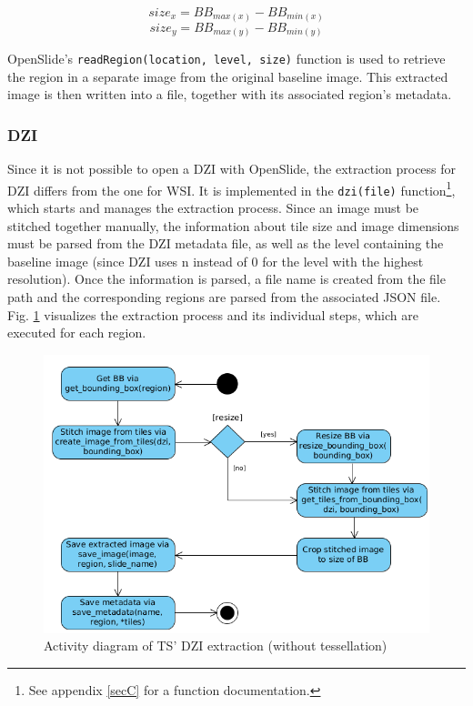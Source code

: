 \begin{equation}\label{eq:sizeX}
size_x = BB_{max(x)} - BB_{min(x)}
\end{equation}
\begin{equation}\label{eq:sizey}
size_y = BB_{max(y)} - BB_{min(y)}
\end{equation}

OpenSlide's \texttt{readRegion(location, level, size)} function is used to retrieve the region in a separate image from the original baseline image. This extracted image is then written into a file, together with its associated region's metadata.

\subsubsection{DZI}
Since it is not possible to open a DZI with OpenSlide, the extraction process for DZI differs from the one for WSI. It is implemented in the \texttt{dzi(file)} function\footnote{
	See appendix \ref{secC} for a function documentation.
}, which starts and manages the extraction process. Since an image must be stitched together manually, the information about tile size and image dimensions must be parsed from the DZI metadata file, as well as the level containing the baseline image (since DZI uses n instead of 0 for the level with the highest resolution). Once the information is parsed, a file name is created from the file path and the corresponding regions are parsed from the associated JSON file. Fig. \ref{fig5_tsDziUml} visualizes the extraction process and its individual steps, which are executed for each region.

\begin{figure}[!h]
	\begin{center}
		\includegraphics[scale=0.45]{img/ts_dzi_uml.png}
		\caption{Activity diagram of TS' DZI extraction (without tessellation)}
		\label{fig5_tsDziUml}
	\end{center}
\end{figure}


